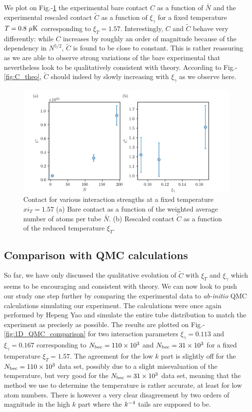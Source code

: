 We plot on Fig.-\ref{fig:C_vs_N} the experimental bare contact $C$ as a function of $\bar{N}$ and the experimental rescaled contact $\tilde{C}$ as a function of $\xi_{\gamma}$ for a fixed temperature $T=0.8 \ \mu \rm{K}$ corresponding to $\xi_T=1.57$. Interestingly, $C$ and $\tilde{C}$ behave very differently: while $C$ increases by roughly an order of magnitude because of the dependency in $N^{5/2}$, $\tilde{C}$ is found to be close to constant. This is rather reassuring as we are able to observe strong variations of the bare experimental that nevertheless look to be qualitatively consistent with theory. According to Fig.-\ref{fig:C_theo}, $\tilde{C}$ should indeed by slowly increasing with $\xi_{\gamma}$ as we observe here.

\begin{figure}
    \centering
    \includegraphics[width=\textwidth]{Fig/Chapter5/C_tilde_vs_N.png}
    \caption{Contact for various interaction strengths at a fixed temperature $xi_T=1.57$ (a) Bare contact as a function of the weighted average number of atoms per tube $\bar{N}$. (b) Rescaled contact $\tilde{C}$ as a function of the reduced temperature $\xi_T$.}
    \label{fig:C_vs_N}
\end{figure}

\subsection{Comparison with QMC calculations}

So far, we have only discussed the qualitative evolution of $\tilde{C}$ with $\xi_T$ and $\xi_{\gamma}$ which seems to be encouraging and consistent with theory. We can now look to push our study one step further by comparing the experimental data to {\it ab-initio} QMC calculations simulating our experiment. The calculations were once again performed by Hepeng Yao and simulate the entire tube distribution to match the experiment as precisely as possible. The results are plotted on Fig.-\ref{fig:1D_QMC_comparison} for two interaction parameters $\xi_{\gamma}=0.113$ and $\xi_{\gamma}=0.167$ corresponding to $N_{\rm{bec}}=110 \times 10^3$ and $N_{\rm{bec}}=31 \times 10^3$ for a fixed temperature $\xi_T=1.57$. The agreement for the low $k$ part is slightly off for the $N_{\rm{bec}}=110 \times 10^3$ data set, possibly due to a slight misevaluation of the temperature, but very good for the $N_{\rm{bec}}=31 \times 10^3$ data set, meaning that the method we use to determine the temperature is rather accurate, at least for low atom numbers. There is however a very clear disagreement by two orders of magnitude in the high $k$ part where the $k^{-4}$ tails are supposed to be.


